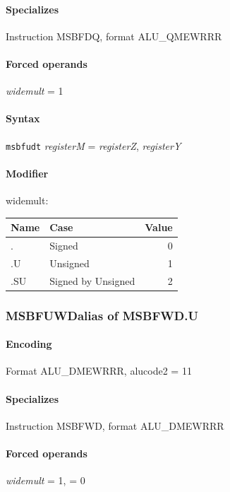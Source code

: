 {\paragraph{Specializes} Instruction MSBFDQ, format ALU\_QMEWRRR

\paragraph{Forced operands} \emph{widemult} = 1

\paragraph{Syntax} \texttt{msbfudt} \emph{registerM} = \emph{registerZ}, \emph{registerY}

\paragraph{Modifier} \textsf{widemult}:\\

\noindent \begin{tabular}{|l|l|r|} \hline
\bf{Name} & \bf{Case} & \bf{Value} \\ \hline
. & Signed & 0 \\
.U & Unsigned & 1 \\
.SU & Signed by Unsigned & 2 \\
\hline \end{tabular}
\newpage
\subsubsection[{\small MSBFUWD: alias of MSBFWD.U}]{MSBFUWD\hfill alias of MSBFWD.U}
\label{instr:MSBFUWD}

\paragraph{Encoding} Format \textsf{ALU\_DMEWRRR, alucode2 = 11}\\



\paragraph{Specializes} Instruction MSBFWD, format ALU\_DMEWRRR

\paragraph{Forced operands} \emph{widemult} = 1, \emph{} = 0

}
